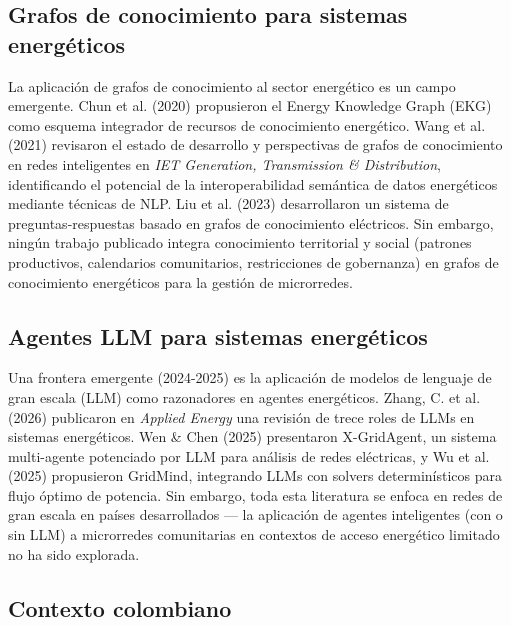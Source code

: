 \documentclass[12pt,letterpaper]{article}
\begin{document}
\subsection*{Grafos de conocimiento para sistemas energ\'eticos}

La aplicaci\'on de grafos de conocimiento al sector energ\'etico es un campo emergente. Chun et al. (2020) propusieron el Energy Knowledge Graph (EKG) como esquema integrador de recursos de conocimiento energ\'etico. Wang et al. (2021) revisaron el estado de desarrollo y perspectivas de grafos de conocimiento en redes inteligentes en \textit{IET Generation, Transmission \& Distribution}, identificando el potencial de la interoperabilidad sem\'antica de datos energ\'eticos mediante t\'ecnicas de NLP. Liu et al. (2023) desarrollaron un sistema de preguntas-respuestas basado en grafos de conocimiento el\'ectricos. Sin embargo, ning\'un trabajo publicado integra conocimiento territorial y social (patrones productivos, calendarios comunitarios, restricciones de gobernanza) en grafos de conocimiento energ\'eticos para la gesti\'on de microrredes.

\subsection*{Agentes LLM para sistemas energ\'eticos}

Una frontera emergente (2024-2025) es la aplicaci\'on de modelos de lenguaje de gran escala (LLM) como razonadores en agentes energ\'eticos. Zhang, C. et al. (2026) publicaron en \textit{Applied Energy} una revisi\'on de trece roles de LLMs en sistemas energ\'eticos. Wen \& Chen (2025) presentaron X-GridAgent, un sistema multi-agente potenciado por LLM para an\'alisis de redes el\'ectricas, y Wu et al. (2025) propusieron GridMind, integrando LLMs con solvers determinísticos para flujo \'optimo de potencia. Sin embargo, toda esta literatura se enfoca en redes de gran escala en pa\'ises desarrollados --- la aplicaci\'on de agentes inteligentes (con o sin LLM) a microrredes comunitarias en contextos de acceso energ\'etico limitado no ha sido explorada.

\subsection*{Contexto colombiano}
\end{document}
